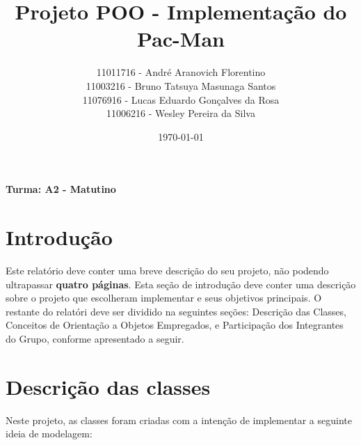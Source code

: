 \documentclass[]{article}
\title{Projeto POO - Implementação do Pac-Man}
\author{11011716 - André Aranovich Florentino\\ 11003216 - Bruno Tatsuya Masunaga Santos\\ 11076916 - Lucas Eduardo Gonçalves da Rosa\\ 11006216 - Wesley Pereira da Silva}
\date{\today}
\begin{document}
\maketitle

\centerline{\textbf{Turma: A2 - Matutino}}

\section{Introdução}
Este relatório deve conter uma breve descrição do seu projeto, não podendo ultrapassar \textbf{quatro páginas}. Esta seção de introdução deve conter uma descrição sobre o projeto que escolheram implementar e seus objetivos principais. O restante do relatóri deve ser dividido na seguintes seções: Descrição das Classes, Conceitos de Orientação a Objetos Empregados, e Participação dos Integrantes do Grupo, conforme apresentado a seguir. 

\section{Descrição das classes}
Neste projeto, as classes foram criadas com a intenção de implementar a seguinte ideia de modelagem: 
\end{document}

